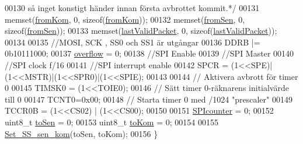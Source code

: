 \begin{DoxyCode}
00130 \textcolor{comment}{      så inget konstigt händer innan första avbrottet kommit.*/}
00131     memset(\hyperlink{_s_p_i_8h_a4c1a44ecc2e0f0cf45cf9b6c0bc3e645}{fromKom}, 0, \textcolor{keyword}{sizeof}(\hyperlink{_s_p_i_8h_a4c1a44ecc2e0f0cf45cf9b6c0bc3e645}{fromKom})); 
00132     memset(\hyperlink{_s_p_i_8h_a2963725e5681e7e146da28127b3e09d3}{fromSen}, 0, \textcolor{keyword}{sizeof}(\hyperlink{_s_p_i_8h_a2963725e5681e7e146da28127b3e09d3}{fromSen}));
00133     memset(\hyperlink{_s_p_i_8h_ab15ab508531e452eb0768f69f7c588da}{lastValidPacket}, 0, \textcolor{keyword}{sizeof}(\hyperlink{_s_p_i_8h_ab15ab508531e452eb0768f69f7c588da}{lastValidPacket}));
00134     
00135     \textcolor{comment}{//MOSI, SCK , SS0 och SS1 är utgångar}
00136     DDRB |= 0b10111000; 
00137     \hyperlink{_s_p_i_8c_a153ce55af60458b262b041d44bfe9350}{overflow} = 0;
00138     \textcolor{comment}{//SPI Enable}
00139     \textcolor{comment}{//SPI Master}
00140     \textcolor{comment}{//SPI clock f/16}
00141     \textcolor{comment}{//SPI interrupt enable}
00142     SPCR = (1<<SPE)|(1<<MSTR)|(1<<SPR0)|(1<<SPIE);
00143     
00144     \textcolor{comment}{// Aktivera avbrott för timer 0}
00145     TIMSK0 = (1<<TOIE0);
00146     \textcolor{comment}{// Sätt timer 0-räknarens initialvärde till 0}
00147     TCNT0=0x00;
00148     \textcolor{comment}{// Starta timer 0 med /1024 "prescaler"}
00149     TCCR0B = (1<<CS02) | (1<<CS00);
00150     
00151     \hyperlink{_s_p_i_8c_a65d46084e88aa717b668dffbbda1bf3b}{SPIcounter} = 0;
00152     uint8\_t \hyperlink{_s_p_i_8c_a877332cdcfad9d61a433fda50f5fb1b5}{toSen} = 0;
00153     uint8\_t \hyperlink{_s_p_i_8c_ae9f07651aa8c38a27c260082879ab9b2}{toKom} = 0;
00154     
00155     \hyperlink{_s_p_i_8c_a21ae89e79b07cfb95e2674541cf5ee27}{Set\_SS\_sen\_kom}(toSen, toKom);
00156 \}
\end{DoxyCode}
